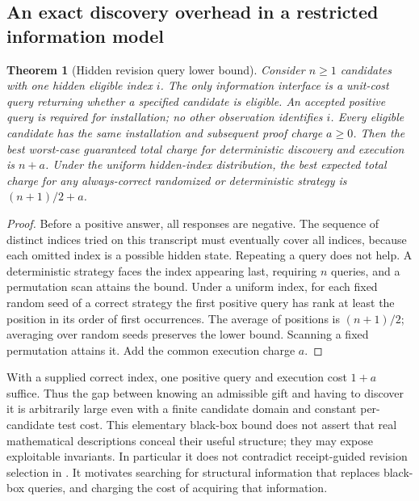 \documentclass[11pt]{article}
\newtheorem{theorem}{Theorem}[section]
\theoremstyle{remark}\newtheorem{remark}[theorem]{Remark}
\begin{document}
\subsection{An exact discovery overhead in a restricted information model}
\begin{theorem}[Hidden revision query lower bound]\label{thm:query}
Consider $n\ge1$ candidates with one hidden eligible index $i$. The only information interface is a unit-cost query returning whether a specified candidate is eligible. An accepted positive query is required for installation; no other observation identifies $i$. Every eligible candidate has the same installation and subsequent proof charge $a\ge0$. Then the best worst-case guaranteed total charge for deterministic discovery and execution is $n+a$. Under the uniform hidden-index distribution, the best expected total charge for any always-correct randomized or deterministic strategy is $(n+1)/2+a$.
\end{theorem}
\begin{proof}
Before a positive answer, all responses are negative. The sequence of distinct indices tried on this transcript must eventually cover all indices, because each omitted index is a possible hidden state. Repeating a query does not help. A deterministic strategy faces the index appearing last, requiring $n$ queries, and a permutation scan attains the bound. Under a uniform index, for each fixed random seed of a correct strategy the first positive query has rank at least the position in its order of first occurrences. The average of positions is $(n+1)/2$; averaging over random seeds preserves the lower bound. Scanning a fixed permutation attains it. Add the common execution charge $a$.
\end{proof}
With a supplied correct index, one positive query and execution cost $1+a$ suffice. Thus the gap between knowing an admissible gift and having to discover it is arbitrarily large even with a finite candidate domain and constant per-candidate test cost. This elementary black-box bound does not assert that real mathematical descriptions conceal their useful structure; they may expose exploitable invariants. In particular it does not contradict receipt-guided revision selection in \cite{receipts}. It motivates searching for structural information that replaces black-box queries, and charging the cost of acquiring that information.
\end{document}
